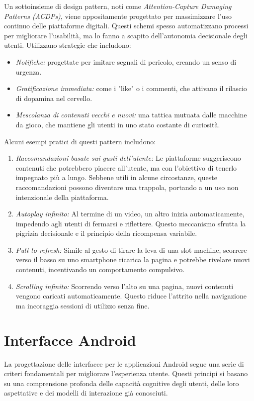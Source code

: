 Un sottoinsieme di design pattern, noti come \textit{Attention-Capture Damaging Patterns (ACDPs)}, viene appositamente progettato per massimizzare l'uso continuo delle piattaforme digitali. Questi schemi spesso automatizzano processi per migliorare l'usabilità, ma lo fanno a scapito dell'autonomia decisionale degli utenti. Utilizzano strategie che includono:
\begin{itemize}
    \item \textit{Notifiche:} progettate per imitare segnali di pericolo, creando un senso di urgenza.
    \item \textit{Gratificazione immediata:} come i "like" o i commenti, che attivano il rilascio di dopamina nel cervello.
    \item \textit{Mescolanza di contenuti vecchi e nuovi:} una tattica mutuata dalle macchine da gioco, che mantiene gli utenti in uno stato costante di curiosità.
\end{itemize}
Alcuni esempi pratici di questi pattern includono:
\begin{enumerate}
    \item \textit{Raccomandazioni basate sui gusti dell'utente:} Le piattaforme suggeriscono contenuti che potrebbero piacere all'utente, ma con l'obiettivo di tenerlo impegnato più a lungo. Sebbene utili in alcune circostanze, queste raccomandazioni possono diventare una trappola, portando a un uso non intenzionale della piattaforma.
    \item \textit{Autoplay infinito:} Al termine di un video, un altro inizia automaticamente, impedendo agli utenti di fermarsi e riflettere. Questo meccanismo sfrutta la pigrizia decisionale e il principio della ricompensa variabile.
    \item \textit{Pull-to-refresh:} Simile al gesto di tirare la leva di una slot machine, scorrere verso il basso su uno smartphone ricarica la pagina e potrebbe rivelare nuovi contenuti, incentivando un comportamento compulsivo.
    \item \textit{Scrolling infinito:} Scorrendo verso l'alto su una pagina, nuovi contenuti vengono caricati automaticamente. Questo riduce l'attrito nella navigazione ma incoraggia sessioni di utilizzo senza fine.
\end{enumerate}

\section{Interfacce Android}
La progettazione delle interfacce per le applicazioni Android segue una serie di criteri fondamentali per migliorare l'esperienza utente. Questi principi si basano su una comprensione profonda delle capacità cognitive degli utenti, delle loro aspettative e dei modelli di interazione già conosciuti.

